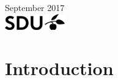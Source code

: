 \documentclass[a4paper]{report}
\theoremstyle{plain}
\begin{document}
\begin{titlepage}


{\large September 2017}\\[2cm] %


\includegraphics{SDU_logo.png}\\[.5cm] %
 

\vfill %

\end{titlepage}
%

%

\clearpage

\tableofcontents


\chapter{Introduction}
    
    
\end{document}
